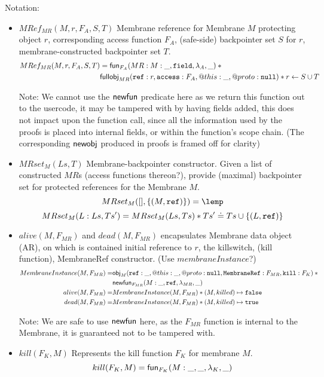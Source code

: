 \documentclass[a4paper]{article}
\begin{document}
Notation:
\begin{itemize}
  \item $MRef_{MR}(M,r,F_A,S,T)$ \qquad Membrane reference for Membrane $M$ protecting object
$r$, corresponding access function $F_A$, (safe-side) backpointer set $S$ for
$r$, membrane-constructed backpointer set $T$.
\begin{align*}
  MRef_{MR}(M,r,F_A,S,T) &= \mathsf{fun}_{F_A}(MR:M:\_, \mathtt{field}, \lambda_A, \_) \mathbin{*} {} \\
                         & \mathsf{fullobj}_{MR}(\mathtt{ref}: r, \mathtt{access}: F_A, @this: \_, @proto: \mathtt{null}) \mathbin{*}
    r \leftarrow S \cup T
\end{align*}

Note: We cannot use the $\mathsf{newfun}$ predicate here as we return this function out
to the usercode, it may be tampered with by having fields added, this does not
impact upon the function call, since all the information used by the proofs is
placed into internal fields, or within the function's scope chain.
(The corresponding $\mathsf{newobj}$ produced in proofs is framed off for clarity)

  \item $MRset_M(Ls,T)$ \qquad Membrane-backpointer constructor. Given a list of
constructed $MR$s (access functions thereon?), provide (maximal) backpointer set
for protected references for the Membrane $M$.
\[ MRset_M([], \{(M, \js{ref})\}) = \lemp \]
\[ MRset_M(L:Ls, Ts') = MRset_M(Ls, Ts) \mathbin{*} Ts' \doteq Ts \cup \{(L, \mathtt{ref})\}\]

  \item $alive(M, F_{MR})$ and $dead(M, F_{MR})$ \qquad encapsulates Membrane data object (AR),
    on which is contained initial reference to $r$, the killswitch, (kill
    function), MembraneRef constructor. (Use $membraneInstance$?)
    \begin{align*}
      MembraneInstance(M, F_{MR}) =& \mathsf{obj}_M(\mathtt{ref}: \_, @this: \_, @proto: \mathtt{null},
      \mathtt{MembraneRef}: F_{MR}, \mathtt{kill}: F_{K}) \mathbin{*} {} \\
  & \mathsf{newfun}_{F_{MR}}(M:\_, \mathtt{ref}, \lambda_{MR}, \_) \\
alive(M, F_{MR}) =& MembraneInstance(M, F_{MR}) \mathbin{*} (M, killed) \mapsto \texttt{false} \\
 dead(M, F_{MR}) =& MembraneInstance(M, F_{MR}) \mathbin{*} (M, killed) \mapsto \texttt{true}
    \end{align*}

    Note: We are safe to use $\mathsf{newfun}$ here, as the $F_{MR}$ function is
    internal to the Membrane, it is guaranteed not to be tampered with.

  \item $kill(F_K, M)$ \qquad Represents the kill function $F_K$ for membrane $M$.
\[ kill(F_K, M) = \mathsf{fun}_{F_K}(M:\_, \_ , \lambda_K, \_) \]

\end{itemize}
\end{document}
